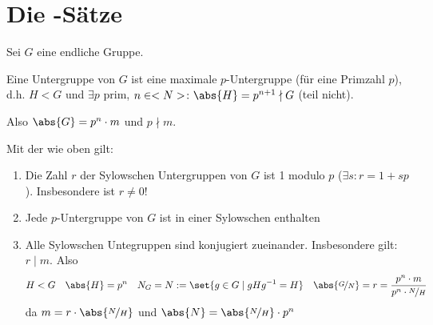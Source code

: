 \section{Die -Sätze}
Sei $G$ eine endliche Gruppe.
\begin{definition}
	Eine Untergruppe von $G$ ist eine maximale $p$-Untergruppe (für eine Primzahl $p$), d.h. $H < G$ und $\exists p$ prim, $n \in \N\colon \abs{H} = p^{n+1} \nmid G$ (teil nicht).
\end{definition}
Also $\abs{G} = p^n \cdot m$ und $p \nmid m$.
\begin{theorem}
	Mit der wie oben gilt:
	\begin{enumerate}
		\item Die Zahl $r$ der Sylowschen Untergruppen von $G$ ist 1 modulo $p$ ($\exists s\colon r = 1+sp$). Insbesondere ist $r \neq 0$!
		\item Jede $p$-Untergruppe von $G$ ist in einer Sylowschen enthalten
		\item Alle Sylowschen Untegruppen sind konjugiert zueinander. Insbesondere gilt: $r \mid m$. Also
		\begin{align*}
			H < G\quad \abs{H} = p^n \quad N_G = N := \set{g\in G \mid gHg^{-1} = H} \quad \abs{\lnkset{G}{N}} = r = \frac{p^n \cdot m}{p^n \cdot \lnkset{N}{H}}
		\end{align*}
		da $m = r \cdot \abs{\lnkset{N}{H}}$ und $\abs{N} = \abs{\lnkset{N}{H}} \cdot p^n$
	\end{enumerate}
\end{theorem}
